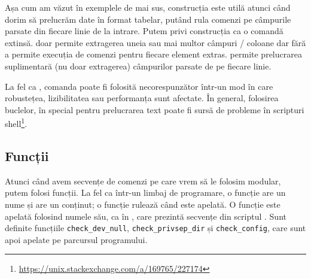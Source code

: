Așa cum am văzut în exemplele de mai sus, construcția  este utilă atunci când dorim să prelucrăm date în format tabelar, putând rula comenzi pe câmpurile parsate din fiecare linie de la intrare.
Putem privi construcția  ca o comandă  extinsă.
 doar permite extragerea uneia sau mai multor câmpuri / coloane dar fără a permite execuția de comenzi pentru fiecare element extras.
 permite prelucrarea suplimentară (nu doar extragerea) câmpurilor parsate de pe fiecare linie.

La fel ca , comanda  poate fi folosită necorespunzător într-un mod în care robustețea, lizibilitatea sau performanța sunt afectate.
În general, folosirea buclelor, în special pentru prelucrarea text poate fi sursă de probleme în scripturi shell\footnote{\url{https://unix.stackexchange.com/a/169765/227174}}.

\subsection{Funcții}
\label{sec:auto:script-func:func}

Atunci când avem secvențe de comenzi pe care vrem să le folosim modular, putem folosi funcții.
La fel ca într-un limbaj de programare, o funcție are un nume și are un conținut;
o funcție rulează când este apelată.
O funcție este apelată folosind numele său, ca în , care prezintă secvențe din scriptul .
Sunt definite funcțiile \texttt{check\_dev\_null}, \texttt{check\_privsep\_dir} și \texttt{check\_config}, care sunt apoi apelate pe parcursul programului.


